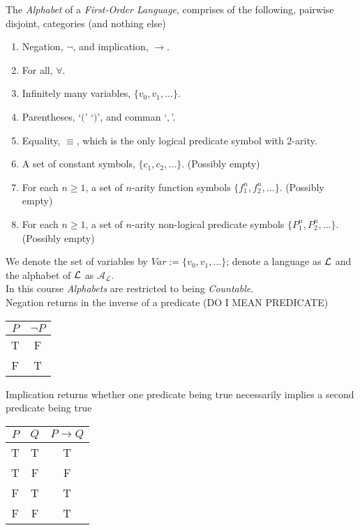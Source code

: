 \documentclass[11pt,a4paper]{article}
\begin{document}
The \textit{Alphabet} of a \textit{First-Order Language}, comprises of the following, pairwise disjoint, categories (and nothing else)
\begin{enumerate}
	\item Negation, $\neg$, and implication, $\longrightarrow$.
	\item For all, $\forall$.
	\item Infinitely many variables, $\{v_0,v_1,\dots\}$.
	\item Parentheses, `$($' `$)$', and comman `$,$'.
	\item Equality, $\equiv$, which is the only logical predicate symbol with 2-arity.
	\item A set of constant symbols, $\{c_1,c_2,\dots\}$. (Possibly empty)
	\item For each $n\geq1$, a set of $n$-arity function symbols $\{f_1^n,f_2^n,\dots\}$. (Possibly empty)
	\item For each $n\geq1$, a set of $n$-arity non-logical predicate symbols $\{P_1^n,P_2^n,\dots\}$. (Possibly empty)
\end{enumerate}
\nb We denote the set of variables by $Var:=\{v_0,v_1,\dots\}$; denote a language as $\mathcal{L}$ and the alphabet of $\mathcal{L}$ as $\mathcal{A_L}$.\\
\nb In this course \textit{Alphabets} are restricted to being \textit{Countable}.\\

Negation returns in the inverse of a predicate (DO I MEAN PREDICATE)
\begin{center}
\begin{tabular}{c|c}
$P$&$\neg P$\\\hline
T&F\\
F&T
\end{tabular}
\end{center}

Implication returns whether one predicate being true necessarily implies a second predicate being true
\begin{center}
\begin{tabular}{cc|c}
$P$&$Q$&$P\to Q$\\\hline
T&T&T\\
T&F&F\\
F&T&T\\
F&F&T
\end{tabular}
\end{center}
\end{document}
